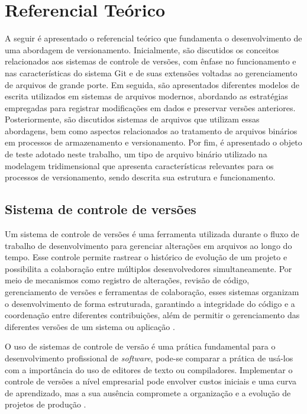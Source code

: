 \chapter{Referencial Teórico}\label{cap:referencial}

A seguir é apresentado o referencial teórico que fundamenta o desenvolvimento de uma abordagem de versionamento. Inicialmente, são discutidos os conceitos relacionados aos sistemas de controle de versões, com ênfase no funcionamento e nas características do sistema Git e de suas extensões voltadas ao gerenciamento de arquivos de grande porte. Em seguida, são apresentados diferentes modelos de escrita utilizados em sistemas de arquivos modernos, abordando as estratégias empregadas para registrar modificações em dados e preservar versões anteriores. Posteriormente, são discutidos sistemas de arquivos que utilizam essas abordagens, bem como aspectos relacionados ao tratamento de arquivos binários em processos de armazenamento e versionamento. Por fim, é apresentado o objeto de teste adotado neste trabalho, um tipo de arquivo binário utilizado na modelagem tridimensional que apresenta características relevantes para os processos de versionamento, sendo descrita sua estrutura e funcionamento.

\section{Sistema de controle de versões}

Um sistema de controle de versões é uma ferramenta utilizada durante o fluxo de trabalho de desenvolvimento para gerenciar alterações em arquivos ao longo do tempo. Esse controle permite rastrear o histórico de evolução de um projeto e possibilita a colaboração entre múltiplos desenvolvedores simultaneamente. Por meio de mecanismos como registro de alterações, revisão de código, gerenciamento de versões e ferramentas de colaboração, esses sistemas organizam o desenvolvimento de forma estruturada, garantindo a integridade do código e a coordenação entre diferentes contribuições, além de permitir o gerenciamento das diferentes versões de um sistema ou aplicação \cite{Spinellis2005}.

O uso de sistemas de controle de versão é uma prática fundamental para o desenvolvimento profissional de \textit{software}, pode-se comparar a prática de usá-los com a importância do uso de editores de texto ou compiladores. Implementar o controle de versões a nível empresarial pode envolver custos iniciais e uma curva de aprendizado, mas a sua ausência compromete a organização e a evolução de projetos de produção \cite{Spinellis2005}.

